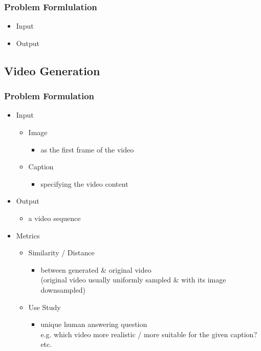 \subsubsection{Problem Formlulation}
\begin{itemize}
\item Input
\item Output
\end{itemize}

\subsection{Video Generation}
\subsubsection{Problem Formulation}
\begin{itemize}
\item Input
	\begin{itemize}
	\item Image
		\begin{itemize}
		\item as the first frame of the video
		\end{itemize}
	\item Caption
		\begin{itemize}
		\item specifying the video content
		\end{itemize}
	\end{itemize}
\item Output
	\begin{itemize}
	\item a video sequence
	\end{itemize}
\item Metrics
	\begin{itemize}
	\item Similarity / Distance
		\begin{itemize}
		\item between generated \& original video \\
		(original video usually uniformly sampled \& with its image downsampled)
		\end{itemize}
	\item Use Study
		\begin{itemize}
		\item unique human answering question \\
		e.g. which video more realistic / more suitable for the given caption? etc.
		\end{itemize}

\end{itemize}
\end{itemize}

